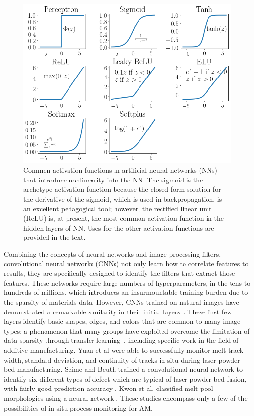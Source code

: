 \begin{figure}
	\includegraphics[width=0.85\linewidth]{Images/ActivationFunctions}
	\caption{Common activation functions in artificial neural networks (NNs) that introduce nonlinearity into the NN. The sigmoid is the archetype activation function because the closed form solution for the derivative of the sigmoid, which is used in backpropagation, is an excellent pedagogical tool; however, the rectified linear unit (ReLU) is, at present, the most common activation function in the hidden layers of NN. Uses for the other activation functions are provided in the text.}
	\label{fig:activation functions}
\end{figure}

Combining the concepts of neural networks and image processing filters, convolutional neural networks (CNNs) not only learn how to correlate features to results, they are specifically designed to identify the filters that extract those features. These networks require large numbers of hyperparameters, in the tens to hundreds of millions, which introduces an insurmountable training burden due to the sparsity of materials data. However, CNNs trained on natural images have demonstrated a remarkable similarity in their initial layers~\cite{Yosinski2014}. These first few layers identify basic shapes, edges, and colors that are common to many image types; a phenomenon that many groups have exploited overcome the limitation of data sparsity through transfer learning~\cite{Ling2017a}, including specific work in the field of additive manufacturing. Yuan et al \cite{Yuan2018} were able to successfully monitor melt track width, standard deviation, and continuity of tracks in situ during laser powder bed manufacturing. Scime and Beuth trained a convolutional neural network to identify six different types of defect which are typical of laser powder bed fusion, with fairly good prediction accuracy \cite{Scime2018}. Kwon et al. classified melt pool morphologies using a neural network \cite{Kwon2018}. These studies encompass only a few of the possibilities of in situ process monitoring for AM. 



